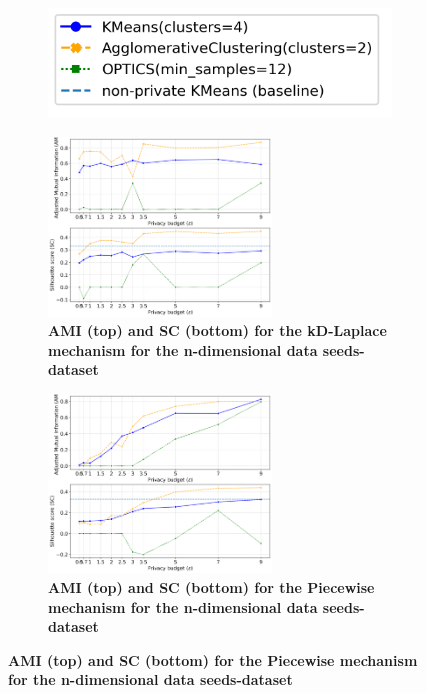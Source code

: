 \begin{figure}[H]
      \centering
      \begin{subfigure}{0.30\textwidth}
            \includegraphics[width=\textwidth]{Results/kd-laplace/kd-Laplace/seeds-dataset/legend_7.png}
      \end{subfigure}
      \begin{subfigure}{1\textwidth}
            \caption{\textbf{AMI (top) and SC (bottom) for the kD-Laplace mechanism for the n-dimensional data seeds-dataset}}
            \centering
            \includegraphics[width=0.65\textwidth]{Results/kd-laplace/kd-Laplace/seeds-dataset/ami-and-sc_7_dimensions.png}
            \centering
      \end{subfigure}
      \begin{subfigure}{1\textwidth}
            \caption{\textbf{AMI (top) and SC (bottom) for the Piecewise mechanism for the n-dimensional data seeds-dataset}}
            \centering
            \includegraphics[width=0.65\textwidth]{Results/kd-laplace/piecewise/seeds-dataset/ami-and-sc_7_dimensions.png}
      \end{subfigure}
      \label{fig:validation-seeds-dataset_comparison_nd-laplace}
\end{figure}
